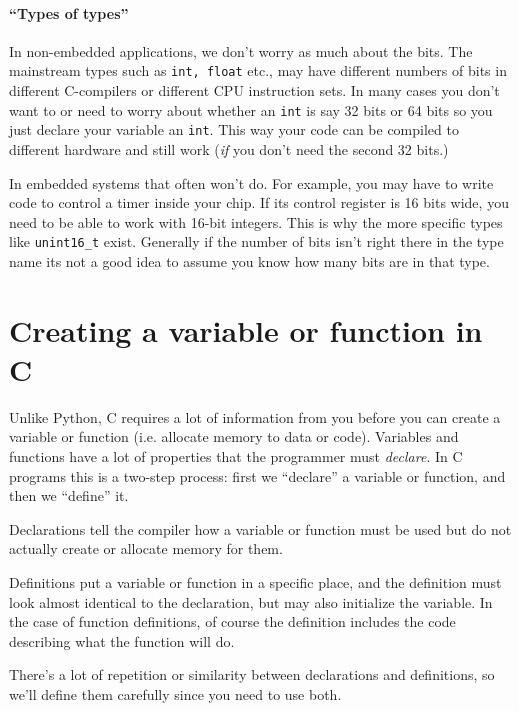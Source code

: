 \paragraph{``Types of types''} In non-embedded applications,
we don't worry as much about the bits.  The mainstream types
such as {\tt int, float} etc., may have different numbers of
bits in different C-compilers or different CPU instruction sets.
In many cases you don't want to or need to worry about whether
an {\tt int} is say 32 bits or 64 bits so you just declare your
variable an {\tt int}.  This way your code can be compiled to
different hardware and still work ({\it if} you don't need
 the second 32 bits.)

In embedded systems that often won't do.  For example, you
may have to write code to control a timer inside your chip.
If its control register is 16 bits wide, you need to be able
to work with 16-bit integers.  This is why the more specific
types like {\tt unint16\_t} exist.  Generally if the number
of bits isn't right there in the type name its not a good
idea to assume you know how many bits are in that type.

\section{Creating a variable or function in C}

Unlike Python, C requires a lot of information from you before you can
create a variable or function (i.e.
allocate memory to data or code).
Variables and functions have a lot
of properties that the programmer must {\it declare}.
In C programs this is a two-step process:  first we ``declare'' a
variable or function, and then we ``define'' it.

Declarations
tell the compiler how a variable or function must be used but do not
actually create or allocate memory for them.

Definitions
put a variable or function in a specific place, and the definition
must look almost identical to the declaration, but may also initialize
the variable.  In the case of function definitions, of course
the definition includes the code describing what the function will
do.

There's a lot of repetition or similarity between declarations
and definitions, so we'll define them carefully since you need to
use both.

